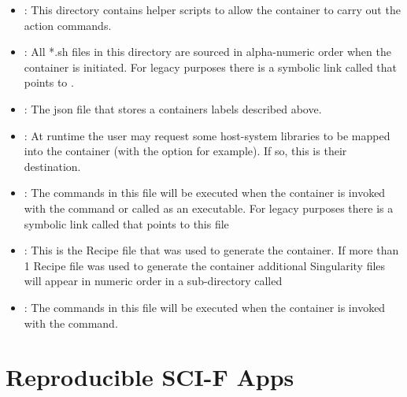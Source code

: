 \documentclass[letterpaper,10pt,english]{sphinxmanual}
\begin{document}
\begin{itemize}
\item {} 
: This directory contains helper scripts to allow the
container to carry out the action commands.

\item {} 
: All *.sh files in this directory are sourced in
alpha-numeric order when the container is initiated. For legacy
purposes there is a symbolic link called  that points to .

\item {} 
: The json file that stores a containers labels
described above.

\item {} 
: At runtime the user may request some host-system libraries
to be mapped into the container (with the  option for example). If so,
this is their destination.

\item {} 
: The commands in this file will be executed when the
container is invoked with the  command or called as an executable. For
legacy purposes there is a symbolic link called  that points to this
file

\item {} 
: This is the Recipe file that was used to generate
the container. If more than 1 Recipe file was used to generate the
container additional Singularity files will appear in numeric order
in a sub-directory called 

\item {} 
: The commands in this file will be executed when the
container is invoked with the  command.

\end{itemize}


\chapter{Reproducible SCI-F Apps}
\label{\detokenize{reproducible_scif_apps:reproducible-sci-f-apps}}\label{\detokenize{reproducible_scif_apps:reproducible-scif-apps}}\label{\detokenize{reproducible_scif_apps::doc}}
\end{document}
